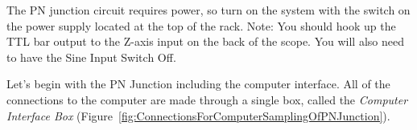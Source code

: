 \documentclass{../lab}
\begin{document}











The PN junction circuit requires power, so turn on the system with the switch on the power supply located at the top of the rack. Note: You should hook up the TTL bar output to the Z-axis input on the back of the scope. You will also need to have the Sine Input Switch Off.

Let's begin with the PN Junction including the computer interface. All of the connections to the computer are made through a single box, called the \emph{Computer Interface Box} (Figure~\ref{fig:ConnectionsForComputerSamplingOfPNJunction}).
\end{document}
